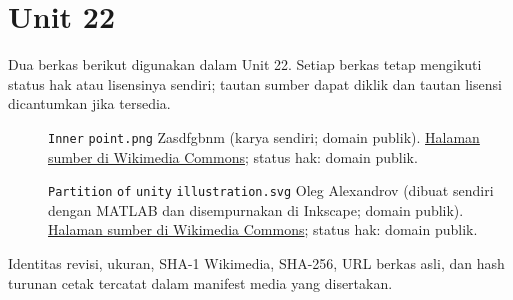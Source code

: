 \section*{Unit 22}
Dua berkas berikut digunakan dalam Unit 22. Setiap berkas tetap mengikuti status hak atau lisensinya sendiri; tautan sumber dapat diklik dan tautan lisensi dicantumkan jika tersedia.
\begin{description}
\item[]\texttt{Inner} \texttt{point.png}
Zasdfgbnm (karya sendiri; domain publik).
\href{https://commons.wikimedia.org/wiki/File:Inner_point.png}{Halaman sumber di Wikimedia Commons}; status hak: domain publik.
\item[]\texttt{Partition} \texttt{of} \texttt{unity} \texttt{illustration.svg}
Oleg Alexandrov (dibuat sendiri dengan MATLAB dan disempurnakan di Inkscape; domain publik).
\href{https://commons.wikimedia.org/wiki/File:Partition_of_unity_illustration.svg}{Halaman sumber di Wikimedia Commons}; status hak: domain publik.
\end{description}
Identitas revisi, ukuran, SHA-1 Wikimedia, SHA-256, URL berkas asli, dan hash turunan cetak tercatat dalam manifest media yang disertakan.
